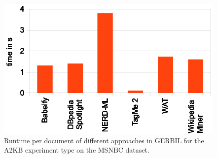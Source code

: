 \begin{figure}[htb]
\centering
\includegraphics[width=\columnwidth]{chapter_three/benchmarking/WWW_GERBIL/needed_times.eps}
\caption{Runtime per document of different approaches in GERBIL for the A2KB experiment type on the MSNBC dataset.}
\label{fig:runtime}
\end{figure}


